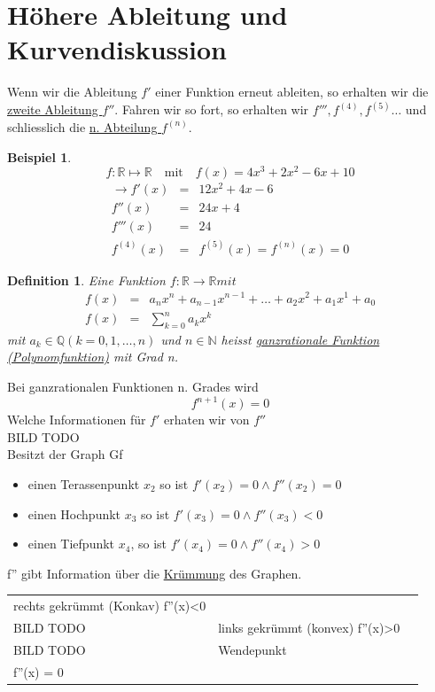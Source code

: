 \documentclass{report}
\newtheorem{mydef}{Definition}
\newtheorem{myexample}{Beispiel}
\newcommand{\N}{{\mathbb N}}
\newcommand{\Q}{{\mathbb Q}}
\newcommand{\R}{{\mathbb R}}
\begin{document}
\section{Höhere Ableitung und Kurvendiskussion}
Wenn wir die Ableitung $f'$ einer Funktion erneut ableiten, so erhalten wir die \underline{zweite Ableitung $f''$}. Fahren wir so fort, so erhalten wir $f''',f^(4),f^(5)\ldots$ und schliesslich die \underline{n. Abteilung $f^(n)$}.
\begin{myexample}
	\begin{equation*}
		f: \mathbb{R} \mapsto \mathbb{R} \quad \mbox{mit} \quad f(x) = 4x^3+2x^2 -6x+10
	\end{equation*}
	\begin{eqnarray}
		\to f'(x) & = & 12x^2 + 4x -6 \nonumber \\
		f''(x) & = & 24x + 4 \nonumber \\
		f'''(x) & = & 24 \nonumber \\
		f^{(4)}(x) & = & f^{(5)}(x) = f^{(n)}(x) = 0 
	\end{eqnarray}
\end{myexample}
\begin{mydef}
	Eine Funktion $f: \R \to \R mit$
	\begin{eqnarray*}
		f(x) &=& a_nx^n+a_{n-1}x^{n-1}+\ldots + a_2x^2 + a_1x^1+a_0\\
		f(x) &=& \sum_{k=0}^n a_kx^k
	\end{eqnarray*}
	mit $a_k\in \Q (k=0,1,\ldots,n)$ und $n \in \N$ heisst \underline{ganzrationale Funktion (Polynomfunktion)} mit Grad n.
\end{mydef}
\noindent
Bei ganzrationalen Funktionen n. Grades wird 
\begin{equation*} f^{n+1}(x) = 0\end{equation*}
Welche Informationen für $f'$ erhaten wir von $f''$\\
BILD TODO\\
Besitzt der Graph Gf 
\begin{itemize}
\item einen Terassenpunkt $x_2$ so ist $f'(x_2) = 0 \land f''(x_2) = 0$\\
\item einen Hochpunkt $x_3$ so ist $f'(x_3) = 0 \land f''(x_3) < 0$\\
\item einen Tiefpunkt $x_4$, so ist $f'(x_4) = 0 \land f''(x_4) > 0$  
\end{itemize}
f'' gibt Information über die \underline{Krümmung} des Graphen.\\
\begin{tabularx}{\textwidth}{XXX}
	rechts gekrümmt (Konkav) f''(x)<0\\BILD TODO & links gekrümmt (konvex) f''(x)>0 \\BILD TODO & Wendepunkt \\ f''(x) = 0
\end{tabularx}
\end{document}
